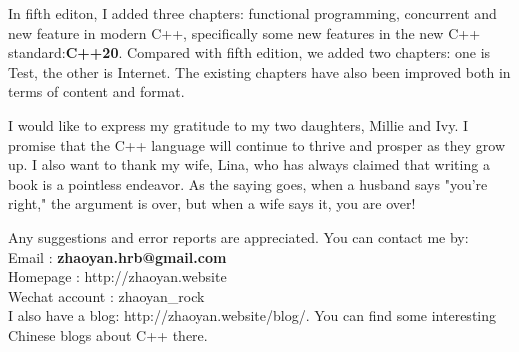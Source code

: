 \documentclass[a4paper,11pt,twoside]{book}
\begin{document}
\medskip

In fifth editon, I added three chapters: functional programming, concurrent and new feature in modern C++,  specifically some new features in the new C++ standard:\textbf{C++20}. Compared with fifth edition, we added two chapters: one is Test, the other is Internet. The existing chapters have also been improved both in terms of content and format. \medskip  

I would like to express my gratitude to my two daughters, Millie and Ivy. I promise that the C++ language will continue to thrive and prosper as they grow up. I also want to thank my wife, Lina, who has always claimed that writing a book is a pointless endeavor. As the saying goes, when a husband says "you're right," the argument is over, but when a wife says it, you are over!  \par \par \medskip


Any suggestions and error reports are appreciated. You can contact me by: \\
Email          : \textbf{zhaoyan.hrb@gmail.com}  \\ 
Homepage       : http://zhaoyan.website  \\ 
Wechat account : zhaoyan\_rock   \\ 

I also have a blog: http://zhaoyan.website/blog/. You can find some interesting Chinese blogs about C++ there. 
\end{document}
